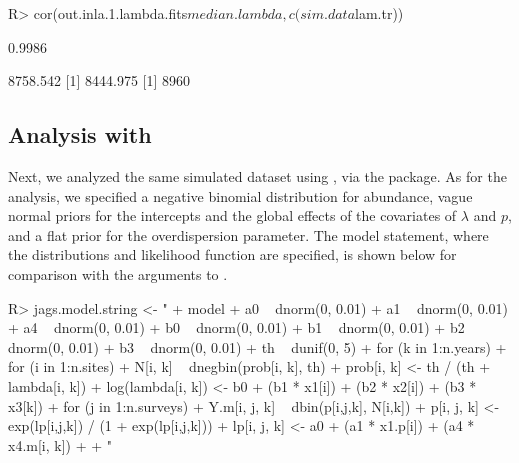 \documentclass[codesnippet]{jss}
\begin{document}
\begin{CodeInput}
R> cor(out.inla.1.lambda.fits$median.lambda, c(sim.data$lam.tr))
\end{CodeInput}
\begin{CodeOutput}
[1] 0.9986
\end{CodeOutput}

\begin{CodeOutput}
[1] 8758.542
[1] 8444.975
[1] 8960
\end{CodeOutput}

\subsection[Analysis with JAGS]{Analysis with }
Next, we analyzed the same simulated dataset using , via the  package. As for the  analysis, we specified a negative binomial distribution for abundance, vague normal priors for the intercepts and the global effects of the covariates of $\lambda$ and $p$, and a flat prior for the overdispersion parameter.  The  model statement, where the distributions and likelihood function are specified, is shown below for comparison with the arguments to .

\begin{CodeInput}
R> jags.model.string <- "
+    model {
+      a0 ~ dnorm(0, 0.01)
+      a1 ~ dnorm(0, 0.01)
+      a4 ~ dnorm(0, 0.01)
+      b0 ~ dnorm(0, 0.01)
+      b1 ~ dnorm(0, 0.01)
+      b2 ~ dnorm(0, 0.01)
+      b3 ~ dnorm(0, 0.01)
+      th ~ dunif(0, 5)
+    for (k in 1:n.years){
+      for (i in 1:n.sites){
+        N[i, k] ~ dnegbin(prob[i, k], th)
+        prob[i, k] <- th / (th + lambda[i, k])
+        log(lambda[i, k]) <- b0 + (b1 * x1[i]) + (b2 * x2[i]) + (b3 * x3[k])
+        for (j in 1:n.surveys){
+          Y.m[i, j, k] ~ dbin(p[i,j,k], N[i,k])
+          p[i, j, k] <- exp(lp[i,j,k]) / (1 + exp(lp[i,j,k]))
+          lp[i, j, k] <- a0 + (a1 * x1.p[i]) + (a4 * x4.m[i, k])
+    }}}}
+  "
\end{CodeInput}
\end{document}
